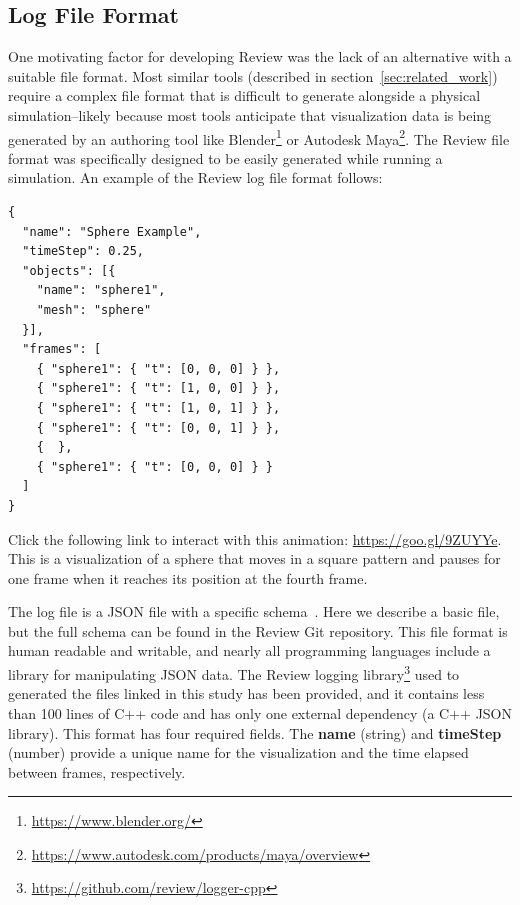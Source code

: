 \subsection{Log File Format}

One motivating factor for developing Review was the lack of an alternative with a suitable file format.
%
Most similar tools (described in section~\ref{sec:related_work}) require a complex file format that is difficult to generate alongside a physical simulation--likely because most tools anticipate that visualization data is being generated by an authoring tool like Blender\footnote{\url{https://www.blender.org/}} or Autodesk Maya\footnote{\url{https://www.autodesk.com/products/maya/overview}}.
%
The Review file format was specifically designed to be easily generated while running a simulation. An example of the Review log file format follows:

\begin{minipage}{\linewidth}
\begin{lstlisting}[style=json]
{
  "name": "Sphere Example",
  "timeStep": 0.25,
  "objects": [{
    "name": "sphere1",
    "mesh": "sphere"
  }],
  "frames": [
    { "sphere1": { "t": [0, 0, 0] } },
    { "sphere1": { "t": [1, 0, 0] } },
    { "sphere1": { "t": [1, 0, 1] } },
    { "sphere1": { "t": [0, 0, 1] } },
    {  },
    { "sphere1": { "t": [0, 0, 0] } }
  ]
}
\end{lstlisting}
\end{minipage}

Click the following link to interact with this animation: \url{https://goo.gl/9ZUYYe}.
%
This is a visualization of a sphere that moves in a square pattern and pauses for one frame when it reaches its position at the fourth frame.


The log file is a JSON file with a specific schema~\autocite{JSON.2018.Schema}. Here we describe a basic file, but the full schema can be found in the Review Git repository.
%
This file format is human readable and writable, and nearly all programming languages include a library for manipulating JSON data.
%
The Review logging library\footnote{\url{https://github.com/review/logger-cpp}} used to generated the  files linked in this study has been provided, and it contains less than 100 lines of C++ code and has only one external dependency (a C++ JSON library).
%
This format has four required fields. The \textbf{name} (string) and \textbf{timeStep} (number) provide a unique name for the visualization and the time elapsed between frames, respectively.


